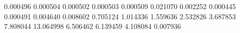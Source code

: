0.000496
0.000504
0.000502
0.000503
0.000509
0.021070
0.002252
0.000445
0.000491
0.004640
0.008602
0.705124
1.014336
1.559636
2.532826
3.687853
7.808044
13.064998
6.506462
6.139459
4.108084
0.007936
